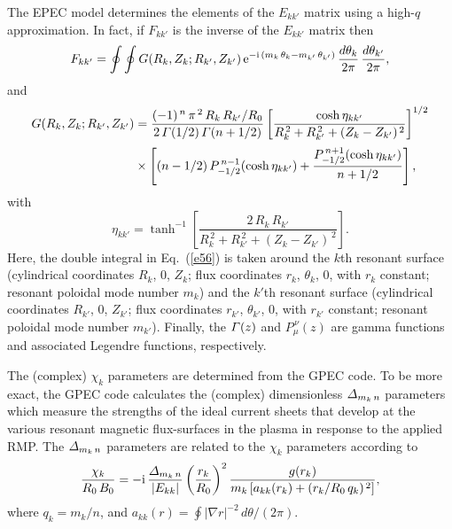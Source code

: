 \documentclass[notitlepage,12pt]{article}
\begin{document}
The EPEC model determines the elements of the $E_{kk'}$ matrix using a high-$q$ approximation. In fact, if $F_{kk'}$ is the inverse of the $E_{kk'}$ matrix then
\begin{equation}\label{e56}
F_{kk'} = \oint\oint 
G(R_k,Z_k;R_{k'},Z_{k'})\,{\rm e}^{-{\rm i}\,(m_k\,\theta_k-m_{k'}\,\theta_{k'})}\,\frac{d\theta_k}{2\pi}\,\frac{d\theta_{k'}}{2\pi},
\end{equation}
and
\begin{align}
 G(R_k,Z_k;R_{k'},Z_{k'})&= \frac{(-1)^{\,n}\,\pi^{\,2}\,R_k\,R_{k'}/R_0}{2\,{\mit\Gamma}(1/2)\,{\mit\Gamma}(n+1/2)}
\left[\frac{\cosh\eta_{kk'}}{R_k^{\,2}+R_{k'}^{\,2}+(Z_k-Z_{k'})^{\,2}}\right]^{1/2}\nonumber\\[0.5ex]
&\times\left[(n-1/2)\,P_{-1/2}^{\,n-1}(\cosh\eta_{kk'})+
\frac{P_{-1/2}^{\,n+1}(\cosh\eta_{kk'})}{n+1/2}\right],
\end{align}
with
\begin{equation}
\eta_{kk'} = \tanh^{-1}\left[\frac{2\,R_k\,R_{k'}}{R_k^{\,2}+R_{k'}^{\,2}+(Z_k-Z_{k'})^{\,2}}\right].
\end{equation}
Here, the double integral in Eq.~(\ref{e56}) is taken around the
$k$th resonant surface (cylindrical coordinates $R_k$, $0$, $Z_k$;
flux coordinates $r_k$, $\theta_k$, $0$, with $r_k$ constant; resonant poloidal mode number $m_k$) and the $k'$th resonant surface (cylindrical coordinates $R_{k'}$, $0$, $Z_{k'}$;
flux coordinates $r_{k'}$, $\theta_{k'}$, $0$, with $r_{k'}$ constant; resonant poloidal mode number $m_{k'}$). Finally, the ${\mit\Gamma}(z)$ and $P_\mu^{\,\nu}(z)$ are gamma functions and associated Legendre functions, respectively.

The (complex) $\chi_k$ parameters are determined from the GPEC code.
To be more exact, the GPEC code calculates the (complex) dimensionless ${\mit\Delta}_{m_k\,n}$ parameters which measure the strengths of the ideal current sheets that develop
at the various resonant magnetic flux-surfaces in the plasma in response to the applied RMP.  The ${\mit\Delta}_{m_k\,n}$ parameters are related to the $\chi_k$ parameters according to
\begin{equation}\label{a8}
\frac{\chi_k}{R_0\,B_0} = -{\rm i} \,\frac{{\mit\Delta}_{m_k\,n}}{|E_{kk}|}\left(\frac{r_k}{R_0}\right)^2
\frac{g(r_k)}{m_k\,[a_{kk}(r_k)+ (r_k/R_0\,q_k)^{\,2}]},
\end{equation}
where $q_k= m_k/n$, and $a_{kk}(r) = \oint |\nabla r|^{-2}\,d\theta/(2\pi)$. 
\end{document}
